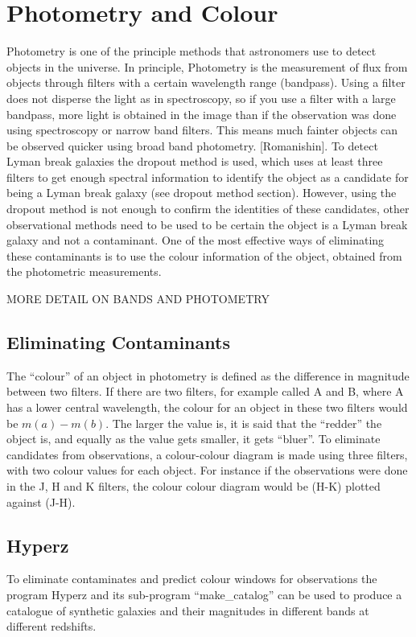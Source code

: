 
\section{Photometry and Colour} %
\label{section:Photometry_Colour}
	Photometry is one of the principle methods that astronomers use to detect objects in the universe. In principle, Photometry is the measurement of flux from objects through filters with a certain wavelength range (bandpass). Using a filter does not disperse the light as in spectroscopy, so if you use a filter with a large bandpass, more light is obtained in the image than if the observation was done using spectroscopy or narrow band filters. This means much fainter objects can be observed quicker using broad band photometry. [Romanishin]. To detect Lyman break galaxies the dropout method is used, which uses at least three filters to get enough spectral information to identify the object as a candidate for being a Lyman break galaxy (see dropout method section). However,  using the dropout method is not enough to confirm the identities of these candidates, other observational methods need to be used to be certain the object is a Lyman break galaxy and not a contaminant. One of the most effective ways of eliminating these contaminants is to use the colour information of the object, obtained from the photometric measurements.

	MORE DETAIL ON BANDS AND PHOTOMETRY

    \subsection{Eliminating Contaminants} %
    \label{sub:Eliminating_Contanimants}
		The ``colour'' of an object in photometry is defined as the difference in magnitude between two filters. If there are two filters, for example called A and B, where A has a lower central wavelength, the colour for an object in these two filters would be $m(a)-m(b)$. The larger the value is, it is said that the ``redder'' the object is, and equally as the value gets smaller, it gets ``bluer''. To eliminate candidates from observations, a colour-colour diagram is made using three filters, with two colour values for each object. For instance if the observations were done in the J, H and K filters, the colour colour diagram would be (H-K) plotted against (J-H).

    \subsection{Hyperz} %
	\label{sub:Hyperz}
		To eliminate contaminates and predict colour windows for observations the program Hyperz and its sub-program ``make\_catalog'' can be used to produce a catalogue of synthetic galaxies and their magnitudes in different bands at different redshifts.

